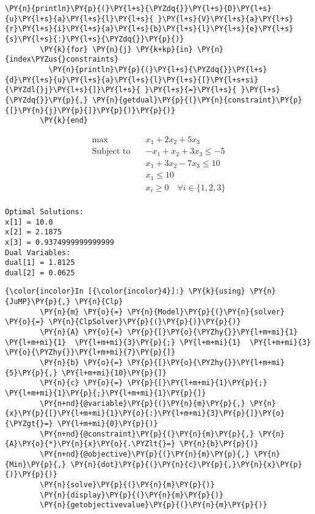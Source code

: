 \begin{Verbatim}[commandchars=\\\{\}]
        \PY{n}{println}\PY{p}{(}\PY{l+s}{\PYZdq{}}\PY{l+s}{D}\PY{l+s}{u}\PY{l+s}{a}\PY{l+s}{l}\PY{l+s}{ }\PY{l+s}{V}\PY{l+s}{a}\PY{l+s}{r}\PY{l+s}{i}\PY{l+s}{a}\PY{l+s}{b}\PY{l+s}{l}\PY{l+s}{e}\PY{l+s}{s}\PY{l+s}{:}\PY{l+s}{\PYZdq{}}\PY{p}{)}
        \PY{k}{for} \PY{n}{j} \PY{k+kp}{in} \PY{n}{index\PYZus{}constraints}
          \PY{n}{println}\PY{p}{(}\PY{l+s}{\PYZdq{}}\PY{l+s}{d}\PY{l+s}{u}\PY{l+s}{a}\PY{l+s}{l}\PY{l+s}{[}\PY{l+s+si}{\PYZdl{}j}\PY{l+s}{]}\PY{l+s}{ }\PY{l+s}{=}\PY{l+s}{ }\PY{l+s}{\PYZdq{}}\PY{p}{,} \PY{n}{getdual}\PY{p}{(}\PY{n}{constraint}\PY{p}{[}\PY{n}{j}\PY{p}{]}\PY{p}{)}\PY{p}{)}
        \PY{k}{end}
\end{Verbatim}


\begin{align*}\max\quad & x_{1} + 2 x_{2} + 5 x_{3}\\
\text{Subject to} \quad & -x_{1} + x_{2} + 3 x_{3} \leq -5\\
 & x_{1} + 3 x_{2} - 7 x_{3} \leq 10\\
 & x_{1} \leq 10\\
 & x_{i} \geq 0 \quad\forall i \in \{1,2,3\}\\
\end{align*}


    
    \begin{Verbatim}[commandchars=\\\{\}]
Optimal Solutions:
x[1] = 10.0
x[2] = 2.1875
x[3] = 0.9374999999999999
Dual Variables:
dual[1] = 1.8125
dual[2] = 0.0625

    \end{Verbatim}

    \begin{Verbatim}[commandchars=\\\{\}]
{\color{incolor}In [{\color{incolor}4}]:} \PY{k}{using} \PY{n}{JuMP}\PY{p}{,} \PY{n}{Clp}
        \PY{n}{m} \PY{o}{=} \PY{n}{Model}\PY{p}{(}\PY{n}{solver} \PY{o}{=} \PY{n}{ClpSolver}\PY{p}{(}\PY{p}{)}\PY{p}{)}
        \PY{n}{A} \PY{o}{=} \PY{p}{[}\PY{o}{\PYZhy{}}\PY{l+m+mi}{1}  \PY{l+m+mi}{1}  \PY{l+m+mi}{3}\PY{p}{;} \PY{l+m+mi}{1}  \PY{l+m+mi}{3} \PY{o}{\PYZhy{}}\PY{l+m+mi}{7}\PY{p}{]}
        \PY{n}{b} \PY{o}{=} \PY{p}{[}\PY{o}{\PYZhy{}}\PY{l+m+mi}{5}\PY{p}{,} \PY{l+m+mi}{10}\PY{p}{]}
        \PY{n}{c} \PY{o}{=} \PY{p}{[}\PY{l+m+mi}{1}\PY{p}{;} \PY{l+m+mi}{1}\PY{p}{;}\PY{l+m+mi}{1}\PY{p}{]}
        \PY{n+nd}{@variable}\PY{p}{(}\PY{n}{m}\PY{p}{,} \PY{n}{x}\PY{p}{[}\PY{l+m+mi}{1}\PY{o}{:}\PY{l+m+mi}{3}\PY{p}{]}\PY{o}{\PYZgt{}=} \PY{l+m+mi}{0}\PY{p}{)}
        \PY{n+nd}{@constraint}\PY{p}{(}\PY{n}{m}\PY{p}{,} \PY{n}{A}\PY{o}{*}\PY{n}{x}\PY{o}{.\PYZlt{}=} \PY{n}{b}\PY{p}{)}
        \PY{n+nd}{@objective}\PY{p}{(}\PY{n}{m}\PY{p}{,} \PY{n}{Min}\PY{p}{,} \PY{n}{dot}\PY{p}{(}\PY{n}{c}\PY{p}{,}\PY{n}{x}\PY{p}{)}\PY{p}{)}
        \PY{n}{solve}\PY{p}{(}\PY{n}{m}\PY{p}{)}
        \PY{n}{display}\PY{p}{(}\PY{n}{m}\PY{p}{)}
        \PY{n}{getobjectivevalue}\PY{p}{(}\PY{n}{m}\PY{p}{)}
\end{Verbatim}


